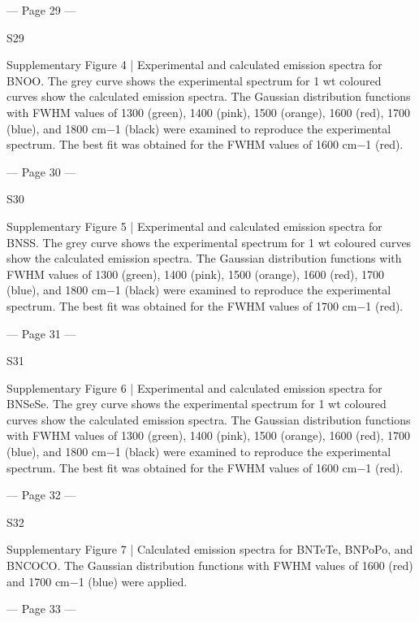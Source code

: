  


--- Page 29 ---
 
S29 
 
Supplementary Figure 4 | Experimental and calculated emission spectra for BNOO. The 
grey curve shows the experimental spectrum for 1 wt%
coloured curves show the calculated emission spectra. The Gaussian distribution functions 
with FWHM values of 1300 (green), 1400 (pink), 1500 (orange), 1600 (red), 1700 (blue), and 
1800 cm−1 (black) were examined to reproduce the experimental spectrum. The best fit was 
obtained for the FWHM values of 1600 cm−1 (red). 
 
 


--- Page 30 ---
 
S30 
 
Supplementary Figure 5 | Experimental and calculated emission spectra for BNSS. The 
grey curve shows the experimental spectrum for 1 wt%
coloured curves show the calculated emission spectra. The Gaussian distribution functions 
with FWHM values of 1300 (green), 1400 (pink), 1500 (orange), 1600 (red), 1700 (blue), and 
1800 cm−1 (black) were examined to reproduce the experimental spectrum. The best fit was 
obtained for the FWHM values of 1700 cm−1 (red). 
 
 


--- Page 31 ---
 
S31 
 
Supplementary Figure 6 | Experimental and calculated emission spectra for BNSeSe. The 
grey curve shows the experimental spectrum for 1 wt%
coloured curves show the calculated emission spectra. The Gaussian distribution functions 
with FWHM values of 1300 (green), 1400 (pink), 1500 (orange), 1600 (red), 1700 (blue), and 
1800 cm−1 (black) were examined to reproduce the experimental spectrum. The best fit was 
obtained for the FWHM values of 1600 cm−1 (red). 
 
 
 


--- Page 32 ---
 
S32 
 
Supplementary Figure 7 | Calculated emission spectra for BNTeTe, BNPoPo, and 
BNCOCO. The Gaussian distribution functions with FWHM values of 1600 (red) and 1700 
cm−1 (blue) were applied. 
 
 


--- Page 33 ---
 
